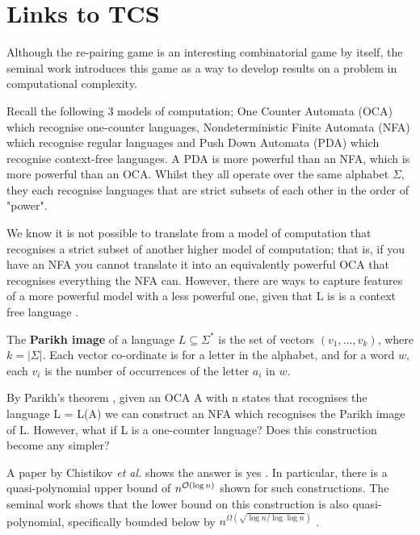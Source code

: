 \section{Links to TCS}
Although the re-pairing game is an interesting combinatorial game by itself, the seminal work introduces this game as a way to develop results on a problem in computational complexity.

Recall the following 3 models of computation; One Counter Automata (OCA) which recognise one-counter languages, Nondeterministic Finite Automata (NFA) which recognise regular languages and Push Down Automata (PDA) which recognise context-free languages. A PDA is more powerful than an NFA, which is more powerful than an OCA. Whilst they all operate over the same alphabet $\Sigma$, they each recognise languages that are strict subsets of each other in the order of "power". 

We know it is not possible to translate from a model of computation that recognises a strict subset of another higher model of computation; that is, if you have an NFA you cannot translate it into an equivalently powerful OCA that recognises everything the NFA can. However, there are ways to capture features of a more powerful model with a less powerful one, given that L is is a context free language \cite{parikhTheorem}. 

The \textbf{Parikh image} of a language $L\subseteq\Sigma^*$ is the set of vectors $(v_1,\dots,v_k)$, where $k = |\Sigma|$. Each vector co-ordinate is for a letter in the alphabet, and for a word $w$, each $v_i$ is the number of occurrences of the letter $a_i$ in $w$. 

By Parikh's theorem \cite{parikhTheorem}, given an OCA A with n states that recognises the language L = L(A) we can construct an NFA which recognises the Parikh image of L. However, what if L is a one-counter language? Does this construction become any simpler? 

A paper by Chistikov \textit{et al.} shows the answer is yes \cite{chistikov2016oca}. In particular, there is a quasi-polynomial upper bound of $n^{\mathcal{O}(\log n)}$ shown for such constructions. The seminal work shows that the lower bound on this construction is also quasi-polynomial, specifically bounded below by $n^{\Omega(\sqrt{\log n / \log\log n})}$ \cite{chistikov2020re}. 